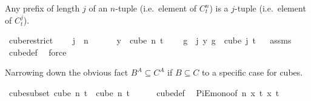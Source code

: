 \begin{isabellebody}
{\isafoldproof}%
%
\isadelimproof
%
\endisadelimproof
%
\begin{isamarkuptext}%
Any prefix of length $j$ of an $n$-tuple (i.e.\ element of $C^n_t$) is a $j$-tuple
(i.e.\ element of $C^j_t$).%
\end{isamarkuptext}\isamarkuptrue%
\isamarkupfalse%
\ cube{\isacharunderscore}{\kern0pt}restrict{\isacharcolon}{\kern0pt}\ \isanewline
\ \ \ {\isachardoublequoteopen}j\ {\isacharless}{\kern0pt}\ n{\isachardoublequoteclose}\ \isanewline
\ \ \ \ \ {\isachardoublequoteopen}y\ {\isasymin}\ cube\ n\ t{\isachardoublequoteclose}\ \isanewline
\ \ \ {\isachardoublequoteopen}{\isacharparenleft}{\kern0pt}{\isasymlambda}g\ {\isasymin}\ {\isacharbraceleft}{\kern0pt}{\isachardot}{\kern0pt}{\isachardot}{\kern0pt}{\isacharless}{\kern0pt}j{\isacharbraceright}{\kern0pt}{\isachardot}{\kern0pt}\ y\ g{\isacharparenright}{\kern0pt}\ {\isasymin}\ cube\ j\ t{\isachardoublequoteclose}%
\isadelimproof
\ %
\endisadelimproof
%
\isatagproof
{}\isamarkupfalse%
\ assms\ \isamarkupfalse%
\ cube{\isacharunderscore}{\kern0pt}def\ \isamarkupfalse%
\ force%
\endisatagproof
{\isafoldproof}%
%
\isadelimproof
%
\endisadelimproof
%
\begin{isamarkuptext}%
Narrowing down the obvious fact $B^A \subseteq C^A$ if $B \subseteq C$ to a specific case for cubes.%
\end{isamarkuptext}\isamarkuptrue%
\isamarkupfalse%
\ cube{\isacharunderscore}{\kern0pt}subset{\isacharcolon}{\kern0pt}\ {\isachardoublequoteopen}cube\ n\ t\ {\isasymsubseteq}\ cube\ n\ {\isacharparenleft}{\kern0pt}t\ {\isacharplus}{\kern0pt}\ {}{\isacharparenright}{\kern0pt}{\isachardoublequoteclose}\isanewline
%
\isadelimproof
\ \ %
\endisadelimproof
%
\isatagproof
{}\isamarkupfalse%
\ cube{\isacharunderscore}{\kern0pt}def\ \isamarkupfalse%
\ PiE{\isacharunderscore}{\kern0pt}mono{\isacharbrackleft}{\kern0pt}of\ {\isachardoublequoteopen}{\isacharbraceleft}{\kern0pt}{\isachardot}{\kern0pt}{\isachardot}{\kern0pt}{\isacharless}{\kern0pt}n{\isacharbraceright}{\kern0pt}{\isachardoublequoteclose}\ {\isachardoublequoteopen}{\isasymlambda}x{\isachardot}{\kern0pt}\ {\isacharbraceleft}{\kern0pt}{\isachardot}{\kern0pt}{\isachardot}{\kern0pt}{\isacharless}{\kern0pt}t{\isacharbraceright}{\kern0pt}{\isachardoublequoteclose}\ {\isachardoublequoteopen}{\isasymlambda}x{\isachardot}{\kern0pt}\ {\isacharbraceleft}{\kern0pt}{\isachardot}{\kern0pt}{\isachardot}{\kern0pt}{\isacharless}{\kern0pt}t{\isacharplus}{\kern0pt}{}{\isacharbraceright}{\kern0pt}{\isachardoublequoteclose}{\isacharbrackright}{\kern0pt}\isanewline

\end{isabellebody}
